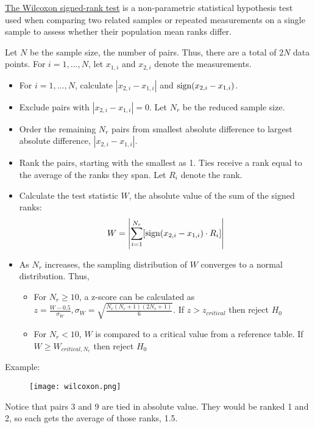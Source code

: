 \href{http://en.wikipedia.org/wiki/Wilcoxon_signed-rank_test}{The Wilcoxon signed-rank test} is a non-parametric statistical hypothesis test used when comparing two related samples or repeated measurements on a single sample to assess whether their population mean ranks differ.

Let $N$ be the sample size, the number of pairs. Thus, there are a total of $2N$ data points. For $i = 1, \dots , N$, let $x_{1,i}$ and $x_{2,i}$ denote the measurements.
\begin{itemize}
\item For $i = 1, \dots , N$, calculate $|x_{2,i} - x_{1,i}|$ and $\operatorname{sign}(x_{2,i} - x_{1,i})$.
\item Exclude pairs with $|x_{2,i} - x_{1,i}| = 0$. Let $N_r$ be the reduced sample size.
\item Order the remaining $N_r$ pairs from smallest absolute difference to largest absolute difference, $|x_{2,i} - x_{1,i}|$.
\item Rank the pairs, starting with the smallest as 1. Ties receive a rank equal to the average of the ranks they span. Let $R_i$ denote the rank.
\item Calculate the test statistic $W$, the absolute value of the sum of the signed ranks:
\begin{equation*}
W = \left|\sum_{i=1}^{N_r} [\operatorname{sign}(x_{2,i} - x_{1,i}) \cdot R_i]\right|
\end{equation*}
\item As $N_r$ increases, the sampling distribution of $W$ converges to a normal distribution. Thus,
\begin{itemize}
\item For $N_r \geqslant 10$, a z-score can be calculated as $z = \frac{W - 0.5}{\sigma_W}, \sigma_W = \sqrt{\frac{N_r(N_r + 1)(2N_r + 1)}{6}}$. If $z > z_{critical}$ then reject $H_0$
\item For $N_r < 10$, $W$ is compared to a critical value from a reference table. If $W \geqslant W_{critical, N_r}$ then reject $H_0$
\end{itemize}
\end{itemize}

Example:
\begin{figure}[H]
    \centering
    \texttt{[image: wilcoxon.png]}
\end{figure}

Notice that pairs 3 and 9 are tied in absolute value. They would be ranked 1 and 2, so each gets the average of those ranks, 1.5.\\


